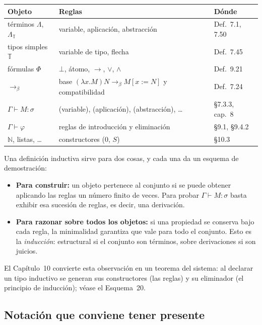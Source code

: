 \documentclass[11pt,a4paper]{article}
\newcommand{\bred}{\rightarrow_\beta}
\begin{document}
\begin{center}
\renewcommand{\arraystretch}{1.25}
\begin{tabular}{@{}lll@{}}
\toprule
\textbf{Objeto} & \textbf{Reglas} & \textbf{Dónde}\\
\midrule
términos \(\Lambda\), \(\Lambda_{\mathbb T}\) & variable, aplicación, abstracción & Def.~7.1, 7.50\\
tipos simples \(\mathbb T\) & variable de tipo, flecha & Def.~7.45\\
fórmulas \(\Phi\) & \(\bot\), átomo, \(\to\), \(\vee\), \(\wedge\) & Def.~9.21\\
\(\bred\) & base \((\lambda x.M)N\bred M[x:=N]\) y compatibilidad & Def.~7.24\\
\(\Gamma\vdash M:\sigma\) & (variable), (aplicación), (abstracción), \dots & §7.3.3, cap.~8\\
\(\Gamma\vdash\varphi\) & reglas de introducción y eliminación & §9.1, §9.4.2\\
\(\mathbb N\), listas, \dots & constructores (\(0\), \(S\)) & §10.3\\
\bottomrule
\end{tabular}
\end{center}

Una definición inductiva sirve para dos cosas, y cada una da un esquema de
demostración:

\begin{itemize}
  \item \textbf{Para construir:} un objeto pertenece al conjunto si se puede
    obtener aplicando las reglas un número finito de veces. Para probar
    \(\Gamma\vdash M:\sigma\) basta exhibir esa sucesión de reglas, es decir,
    una derivación.
  \item \textbf{Para razonar sobre todos los objetos:} si una propiedad se
    conserva bajo cada regla, la minimalidad garantiza que vale para todo el
    conjunto. Esto es la \emph{inducción}: estructural si el conjunto son
    términos, sobre derivaciones si son juicios.
\end{itemize}

El Capítulo~10 convierte esta observación en un teorema del sistema: al
declarar un tipo inductivo se generan sus constructores (las reglas) y su
eliminador (el principio de inducción); véase el Esquema~20.

\subsection{Notación que conviene tener presente}
\end{document}
